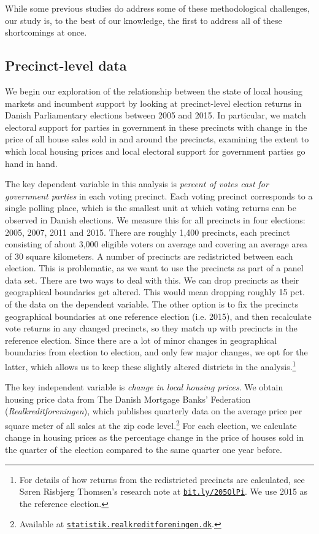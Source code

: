 \documentclass[12pt,a4paper]{article}
\begin{document}
	While some previous studies do address some of these methodological challenges, our study is, to the best of our knowledge, the first to address all of these shortcomings at once.
	
	
	\subsection{Precinct-level data}\label{precinctlevel}
	We begin our exploration of the relationship between the state of local housing markets and incumbent support by looking at precinct-level election returns in Danish Parliamentary elections between 2005 and 2015. In particular, we match electoral support for parties in government in these precincts with change in the price of all house sales sold in and around the precincts, examining the extent to which local housing prices and local electoral support for government parties go hand in hand.
	

	The key dependent variable in this analysis is \textit{percent of votes cast for government parties} in each voting precinct. Each voting precinct corresponds to a single polling place, which is the smallest unit at which voting returns can be observed in Danish elections. We measure this for all precincts in four elections:  2005, 2007, 2011 and 2015. There are roughly 1,400 precincts, each precinct consisting of about 3,000 eligible voters on average and covering an average area of 30 square kilometers. A number of precincts are redistricted between each election. This is problematic, as we want to use the precincts as part of a panel data set. There are two ways to deal with this. We can drop precincts as their geographical boundaries get altered. This would mean dropping roughly 15 pct. of the data on the dependent variable. The other option is to fix the precincts geographical boundaries at one reference election (i.e. 2015), and then recalculate vote returns in any changed precincts, so they match up with precincts in the reference election. Since there are a lot of minor changes in geographical boundaries from election to election, and only few major changes, we opt for the latter, which allows us to keep these slightly altered districts in the analysis.\footnote{For details of how returns from the redistricted precincts are calculated, see Søren Risbjerg Thomsen's research note at \texttt{\href{http://bit.ly/205OlPi}{bit.ly/205OlPi}}.  We use 2015 as the reference election.}
	
	The key independent variable is \textit{change in local housing prices}. We obtain housing price data from The Danish Mortgage Banks' Federation (\textit{Realkreditforeningen}), which publishes quarterly data on the average price per square meter of all sales at the zip code level.\footnote{Available at \texttt{\href{http://statistik.realkreditforeningen.dk/}{statistik.realkreditforeningen.dk}}.} For each election, we calculate change in housing prices as the percentage change in the price of houses sold in the quarter of the election compared to the same quarter one year before.
	
\end{document}
